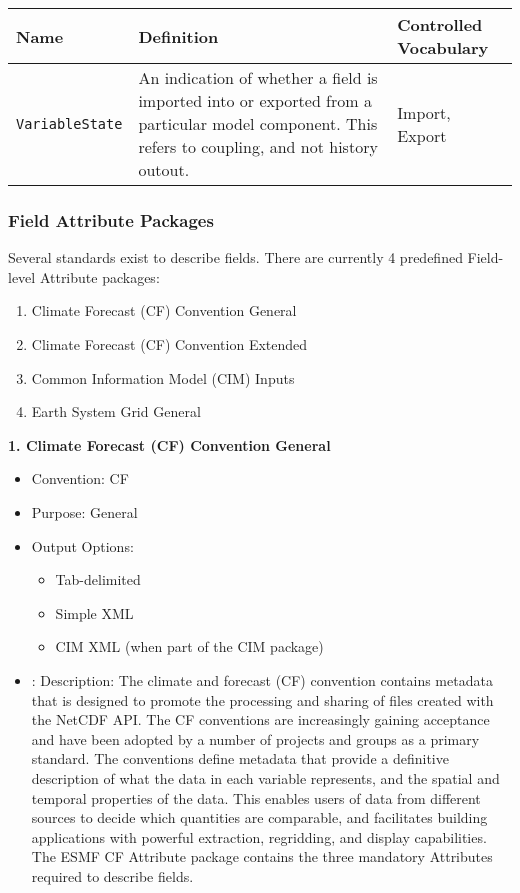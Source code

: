 \begin{tabular}{|p{8cm}|p{20cm}|p{10cm}|}
    {\bf Name } & {\bf Definition} & {\bf Controlled Vocabulary} \\
    \hline\hline
    {\tt VariableState} & An indication of whether a field is imported into or exported from a particular model component. This refers to coupling, and not history outout. & Import, Export \\
\end{tabular}


\vspace{.25in}
\subsubsection{Field Attribute Packages}
\label{FieldAttributePackages}

Several standards exist to describe fields. There are currently 4 predefined Field-level Attribute packages:

\begin{enumerate}
    \item Climate Forecast (CF) Convention General
    \item Climate Forecast (CF) Convention Extended
    \item Common Information Model (CIM) Inputs
    \item Earth System Grid General

\end{enumerate}

\vspace{.25in}
{\bf 1. Climate Forecast (CF) Convention General}

\begin{itemize}
    \item Convention: CF
    \item Purpose: General
    \item Output Options:
    \begin{itemize}
        \item Tab-delimited
        \item Simple XML
        \item CIM XML (when part of the CIM package)
    \end{itemize} 
    \item: Description: The climate and forecast (CF) convention contains metadata that is designed to promote the processing and sharing of files created with the NetCDF API. The CF conventions are increasingly gaining acceptance and have been adopted by a number of projects and groups as a primary standard. The conventions define metadata that provide a definitive description of what the data in each variable represents, and the spatial and temporal properties of the data. This enables users of data from different sources to decide which quantities are comparable, and facilitates building applications with powerful extraction, regridding, and display capabilities. The ESMF CF Attribute package contains the three mandatory Attributes required to describe fields.  
\end{itemize}


